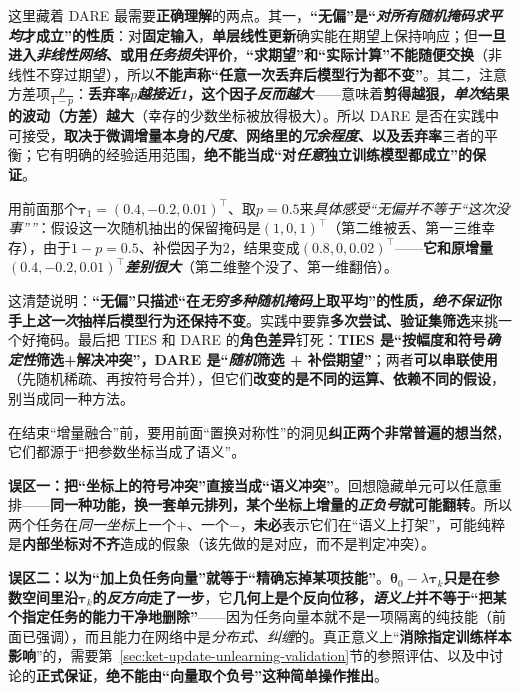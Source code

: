这里藏着 DARE 最需要\textbf{正确理解}的两点。其一，\textbf{“无偏”是“\emph{对所有随机掩码求平均}才成立”的性质}：对\textbf{固定输入}，\textbf{单层线性更新}确实能在期望上保持响应；但\textbf{一旦进入\emph{非线性网络}、或用\emph{任务损失}评价}，\textbf{“求期望”和“实际计算”不能随便交换}（非线性不穿过期望），所以\textbf{不能声称“任意一次丢弃后模型行为都不变”}。其二，注意方差项$\frac{p}{1-p}$：\textbf{丢弃率$p$\emph{越接近1}，这个因子\emph{反而越大}}——意味着\textbf{剪得越狠，\emph{单次}结果的波动（方差）越大}（幸存的少数坐标被放得极大）。所以 DARE 是否在实践中可接受，\textbf{取决于微调增量本身的\emph{尺度}、网络里的\emph{冗余程度}、以及丢弃率}三者的平衡；它有明确的经验适用范围，\textbf{绝不能当成“对\emph{任意}独立训练模型都成立”的保证}。

用前面那个$\bm{\tau}_1=(0.4,-0.2,0.01)^\top$、取$p=0.5$来\emph{具体感受“无偏并不等于“这次没事””}：假设这一次随机抽出的保留掩码是$(1,0,1)^\top$（第二维被丢、第一三维幸存），由于$1-p=0.5$、补偿因子为$2$，结果变成$(0.8,0,0.02)^\top$——\textbf{它和原增量$(0.4,-0.2,0.01)^\top$\emph{差别很大}}（第二维整个没了、第一维翻倍）。

这清楚说明：\textbf{“无偏”只描述“在\emph{无穷多种随机掩码}上取平均”的性质，\emph{绝不保证}你手上\emph{这一次}抽样后模型行为还保持不变}。实践中要靠\textbf{多次尝试、验证集筛选}来挑一个好掩码。最后把 TIES 和 DARE 的\textbf{角色差异}钉死：\textbf{TIES 是“按幅度和符号\emph{确定性}筛选+解决冲突”，DARE 是“\emph{随机}筛选 + 补偿期望”}；两者\textbf{可以串联使用}（先随机稀疏、再按符号合并），但它们\textbf{改变的是不同的运算、依赖不同的假设}，别当成同一种方法。

在结束“增量融合”前，要用前面“置换对称性”的洞见\textbf{纠正两个非常普遍的想当然}，它们都源于“把参数坐标当成了语义”。

\textbf{误区一：把“坐标上的符号冲突”直接当成“语义冲突”}。回想隐藏单元可以任意重排——\textbf{同一种功能，换一套单元排列，某个坐标上增量的\emph{正负号}就可能翻转}。所以两个任务在\emph{同一坐标}上一个$+$、一个$-$，\textbf{未必}表示它们在“语义上打架”，可能纯粹是\textbf{内部坐标对不齐}造成的假象（该先做的是对应，而不是判定冲突）。

\textbf{误区二：以为“加上负任务向量”就等于“精确忘掉某项技能”}。$\bm{\theta}_0-\lambda\bm{\tau}_k$\textbf{只是在参数空间里沿$\bm{\tau}_k$的\emph{反方向}走了一步}，它\textbf{几何上是个反向位移，\emph{语义上}并不等于“把某个指定任务的能力干净地删除”}——因为任务向量本就不是一项隔离的纯技能（前面已强调），而且能力在网络中是\emph{分布式、纠缠}的。真正意义上“\textbf{消除指定训练样本影响}”的，需要第~\ref{sec:ket-update-unlearning-validation}节的参照评估、以及中讨论的\textbf{正式保证}，\textbf{绝不能由“向量取个负号”这种简单操作推出}。

